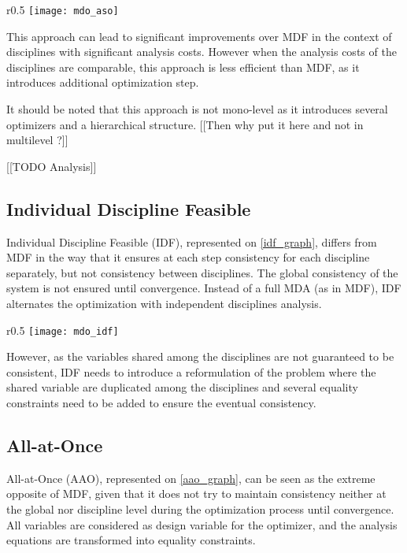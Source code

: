 \begin{wrapfigure}{r}{0.5\textwidth}
\centering
\texttt{[image: mdo\_aso]}
\caption{ASO method}\label{aso_graph}
\end{wrapfigure}

This approach can lead to significant improvements over MDF in the context of disciplines with significant analysis costs. However when the analysis costs of the disciplines are comparable, this approach is less efficient than MDF, as it introduces additional optimization step.

It should be noted that this approach is not mono-level as it introduces several optimizers and a hierarchical structure. [[Then why put it here and not in multilevel ?]] 

[[TODO Analysis]]

\subsection{Individual Discipline Feasible}

Individual Discipline Feasible (IDF), represented on \figurename{} \ref{idf_graph}, differs from MDF in the way that it ensures at each step consistency for each discipline separately, but not consistency between disciplines. The global consistency of the system is not ensured until convergence.
Instead of a full MDA (as in MDF), IDF alternates the optimization with independent disciplines analysis.

\begin{wrapfigure}{r}{0.5\textwidth}
\centering
\texttt{[image: mdo\_idf]}
\caption{IDF method}\label{idf_graph}
\end{wrapfigure}

However, as the variables shared among the disciplines are not guaranteed to be consistent, IDF needs to introduce a reformulation of the problem where the shared variable are duplicated among the disciplines and several equality constraints need to be added to ensure the eventual consistency.

\subsection{All-at-Once}

All-at-Once (AAO), represented on \figurename{} \ref{aao_graph}, can be seen as the extreme opposite of MDF, given that it does not try to maintain consistency neither at the global nor discipline level during the optimization process until convergence.
All variables are considered as design variable for the optimizer, and the analysis equations are transformed into equality constraints.

